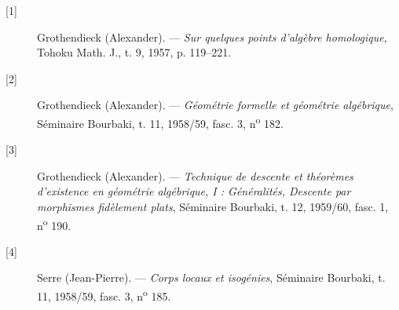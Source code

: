 \begin{description}
  \item[{[1]}] Grothendieck (Alexander). --- \emph{Sur quelques points
    d'algèbre homologique}, Tohoku Math. J., t. 9, 1957, p. 119--221.
  \item[{[2]}] Grothendieck (Alexander). --- \emph{Géométrie formelle et
    géométrie algébrique}, Séminaire Bourbaki, t. 11, 1958/59, fasc. 3,
    n\textsuperscript{o} 182.
  \item[{[3]}] Grothendieck (Alexander). --- \emph{Technique de descente et
    théorèmes d'existence en géométrie algébrique, I : Généralités, Descente
    par morphismes fidèlement plats}, Séminaire Bourbaki, t. 12, 1959/60,
    fasc. 1, n\textsuperscript{o} 190.
  \item[{[4]}] Serre (Jean-Pierre). --- \emph{Corps locaux et isogénies},
    Séminaire Bourbaki, t. 11, 1958/59, fasc. 3, n\textsuperscript{o} 185.
\end{description}
